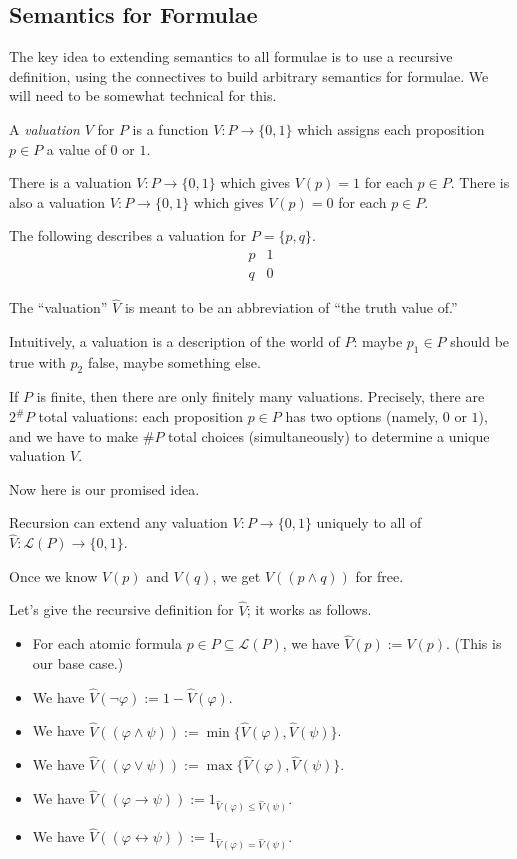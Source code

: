 \subsection{Semantics for Formulae}
The key idea to extending semantics to all formulae is to use a recursive definition, using the connectives to build arbitrary semantics for formulae. We will need to be somewhat technical for this.
\begin{definition}[Valuation]
	A \textit{valuation} $V$ for $P$ is a function $V:P\to\{0,1\}$ which assigns each proposition $p\in P$ a value of $0$ or $1$.
\end{definition}
\begin{example}
	There is a valuation $V:P\to\{0,1\}$ which gives $V(p)=1$ for each $p\in P$. There is also a valuation $V:P\to\{0,1\}$ which gives $V(p)=0$ for each $p\in P$.
\end{example}
\begin{example}
	The following describes a valuation for $P=\{p,q\}$.
	\[\begin{array}{c|c}
		p & 1 \\
		q & 0
	\end{array}\]
\end{example}
\begin{remark}
	The ``valuation'' $\hat V$ is meant to be an abbreviation of ``the truth value of.''
\end{remark}
Intuitively, a valuation is a description of the world of $P$: maybe $p_1\in P$ should be true with $p_2$ false, maybe something else.
\begin{remark}
	If $P$ is finite, then there are only finitely many valuations. Precisely, there are $2^\#P$ total valuations: each proposition $p\in P$ has two options (namely, $0$ or $1$), and we have to make $\#P$ total choices (simultaneously) to determine a unique valuation $V$.
\end{remark}
Now here is our promised idea.
\begin{idea}
	Recursion can extend any valuation $V:P\to\{0,1\}$ uniquely to all of $\hat V:\mathcal L(P)\to\{0,1\}$.
\end{idea}
\begin{example}
	Once we know $V(p)$ and $V(q)$, we get $V((p\land q))$ for free.
\end{example}
Let's give the recursive definition for $\hat V$; it works as follows.
\begin{itemize}
	\item For each atomic formula $p\in P\subseteq\mathcal L(P)$, we have $\hat V(p):=V(p)$. (This is our base case.)
	\item We have $\hat V(\lnot\varphi):=1-\hat V(\varphi)$.
	\item We have $\hat V((\varphi\land\psi)):=\min\{\hat V(\varphi),\hat V(\psi)\}$.
	\item We have $\hat V((\varphi\lor\psi)):=\max\{\hat V(\varphi),\hat V(\psi)\}$.
	\item We have $\hat V((\varphi\to\psi)):=1_{\hat V(\varphi)\le\hat V(\psi)}$.
	\item We have $\hat V((\varphi\leftrightarrow\psi)):=1_{\hat V(\varphi)=\hat V(\psi)}$.
\end{itemize}

